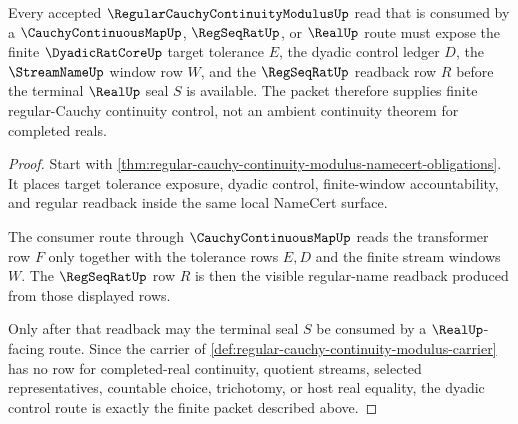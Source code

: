 \begin{theorem}
\label{thm:regular-cauchy-continuity-modulus-dyadic-control}
Every accepted $\RegularCauchyContinuityModulusUp$ read that is consumed by a $\CauchyContinuousMapUp$, $\RegSeqRatUp$, or $\RealUp$ route must expose the finite $\DyadicRatCoreUp$ target tolerance $E$, the dyadic control ledger $D$, the $\StreamNameUp$ window row $W$, and the $\RegSeqRatUp$ readback row $R$ before the terminal $\RealUp$ seal $S$ is available. The packet therefore supplies finite regular-Cauchy continuity control, not an ambient continuity theorem for completed reals.
\end{theorem}
\begin{proof}
Start with \autoref{thm:regular-cauchy-continuity-modulus-namecert-obligations}. It places target tolerance exposure, dyadic control, finite-window accountability, and regular readback inside the same local NameCert surface.

The consumer route through $\CauchyContinuousMapUp$ reads the transformer row $F$ only together with the tolerance rows $E,D$ and the finite stream windows $W$. The $\RegSeqRatUp$ row $R$ is then the visible regular-name readback produced from those displayed rows.

Only after that readback may the terminal seal $S$ be consumed by a $\RealUp$-facing route. Since the carrier of \autoref{def:regular-cauchy-continuity-modulus-carrier} has no row for completed-real continuity, quotient streams, selected representatives, countable choice, trichotomy, or host real equality, the dyadic control route is exactly the finite packet described above.
\end{proof}


\begin{closurestatus}{\RegularCauchyContinuityModulusUp}
  \theoryclosure{\seedClosure}
  \formalstatus{\unformalizedV}
\end{closurestatus}

